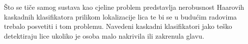 \documentclass[times, utf8, zavrsni, numeric]{fer}
\begin{document}
Što se tiče samog sustava kao cjeline problem predstavlja nerobusnost Haarovih kaskadnih klasifikatora prilikom lokalizacije lica te bi se u budućim radovima trebalo posvetiti i tom problemu. Navedeni kaskadni klasifikatori jako teško detektiraju lice ukoliko je osoba malo nakrivila ili zakrenula glavu.



\end{document}
